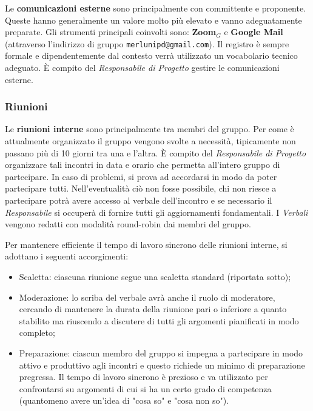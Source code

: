 Le \textbf{comunicazioni esterne} sono principalmente con committente e proponente. Queste hanno generalmente un valore molto più elevato e vanno adeguatamente preparate. Gli strumenti principali coinvolti sono: \textbf{Zoom}$_G$ e \textbf{Google Mail} (attraverso l'indirizzo di gruppo \texttt{merlunipd@gmail.com}). Il registro è sempre formale e dipendentemente dal contesto verrà utilizzato un vocabolario tecnico adeguato. È compito del \textit{Responsabile di Progetto} gestire le comunicazioni esterne.

\subsubsection{Riunioni}
Le \textbf{riunioni interne} sono principalmente tra membri del gruppo. Per come è attualmente organizzato il gruppo vengono svolte a necessità, tipicamente non passano più di 10 giorni tra una e l'altra. È compito del \textit{Responsabile di Progetto} organizzare tali incontri in data e orario che permetta all'intero gruppo di partecipare. In caso di problemi, si prova ad accordarsi in modo da poter partecipare tutti. Nell'eventualità ciò non fosse possibile, chi non riesce a partecipare potrà avere accesso al verbale dell'incontro e se necessario il \textit{Responsabile} si occuperà di fornire tutti gli aggiornamenti fondamentali. I \textit{Verbali} vengono redatti con modalità round-robin dai membri del gruppo.

Per mantenere efficiente il tempo di lavoro sincrono delle riunioni interne, si adottano i seguenti accorgimenti:
\begin{itemize}
  \item Scaletta: ciascuna riunione segue una scaletta standard (riportata sotto);
  \item Moderazione: lo scriba del verbale avrà anche il ruolo di moderatore, cercando di mantenere la durata della riunione pari o inferiore a quanto stabilito ma riuscendo a discutere di tutti gli argomenti pianificati in modo completo;
  \item Preparazione: ciascun membro del gruppo si impegna a partecipare in modo attivo e produttivo agli incontri e questo richiede un minimo di preparazione pregressa. Il tempo di lavoro sincrono è prezioso e va utilizzato per confrontarsi su argomenti di cui si ha un certo grado di competenza (quantomeno avere un'idea di "cosa so" e "cosa non so").
\end{itemize}

